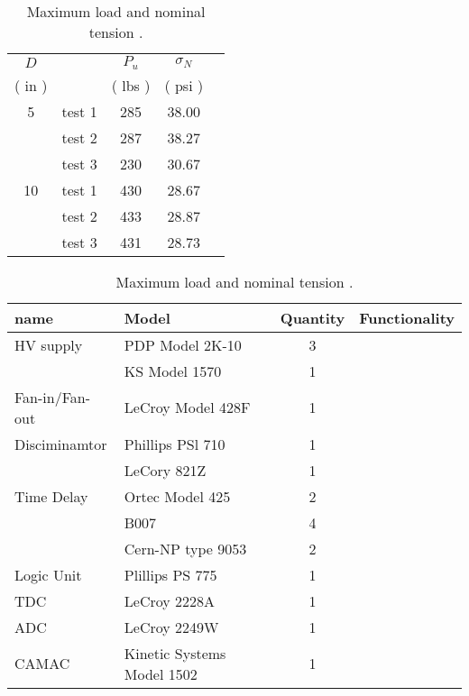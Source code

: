 \documentclass[a4paper, 12pt, onecolumn] {article}
\begin{document}
\begin{table}[tp]%
\caption{Maximum load and nominal tension .}
\label{aggiungi}\centering%
\begin{tabular}{ccccc}
\toprule%
$D$ &                   & $P_u$   & $\sigma_N$\\
( in )&                 & ( lbs ) & ( psi )   \\
\toprule%
5     & test 1          & 285     & 38.00     \\
      & test 2          & 287     & 38.27     \\
      & test 3          & 230     & 30.67     \\
\midrule
10 & test 1             & 430     & 28.67     \\
      & test 2          & 433     & 28.87     \\
      & test 3          & 431     & 28.73     \\
\bottomrule
\end{tabular}
\end{table}



\begin{table}[tp] \large %
\label{aggiungi}\centering%
\begin{tabular}{llc|p{5cm}}
\toprule%


\multicolumn{1}{l}{name}&
\multicolumn{1}{l}{Model}&
\multicolumn{1}{c}{Quantity}&
\multicolumn{1}{l}{Functionality} \\

\toprule%
HV supply		& PDP Model 2K-10			& 3		&		 	\\
				& KS Model 1570				& 1		&			\\
\hline
Fan-in/Fan-out	& LeCroy Model 428F       	& 1     &		    \\

Disciminamtor	& Phillips PSl 710          & 1    	&			\\
				& LeCory 821Z				& 1		&			\\	
\hline
Time Delay		& Ortec Model 425			& 2		&			\\	
				& B007						& 4		&			\\
				& Cern-NP type 9053			& 2		&			\\
\hline
Logic Unit		& Plillips PS 775			& 1		&			\\
\hline
TDC				& LeCroy 2228A				& 1					\\
\hline
ADC				& LeCroy 2249W				& 1					\\
\hline
CAMAC			& Kinetic Systems Model 1502& 1					\\
\bottomrule
\end{tabular}
\caption{Maximum load and nominal tension .}
\end{table}
\end{document}

